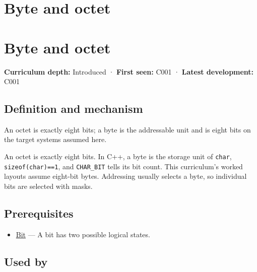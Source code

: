 \hypertarget{appendix-5bee2df85484}{}
\section*{Byte and octet}
\section{Byte and octet}\label{appendix-5bee2df85484-byte-and-octet}

\textbf{Curriculum depth:} Introduced · \textbf{First seen:} C001 · \textbf{Latest development:} C001

\subsection{Definition and mechanism}\label{appendix-5bee2df85484-definition-and-mechanism}

An octet is exactly eight bits; a byte is the addressable unit and is eight bits on the target systems assumed here.

An octet is exactly eight bits. In C++, a byte is the storage unit of \texttt{char}, \texttt{sizeof(char)==1}, and \texttt{CHAR\_BIT} tells its bit count. This curriculum's worked layouts assume eight-bit bytes. Addressing usually selects a byte, so individual bits are selected with masks.

\subsection{Prerequisites}\label{appendix-5bee2df85484-prerequisites}

\begin{itemize}
\tightlist
\item
  \hyperref[appendix-ddbb69998a2e]{Bit} --- A bit has two possible logical states.
\end{itemize}

\subsection{Used by}\label{appendix-5bee2df85484-used-by}

